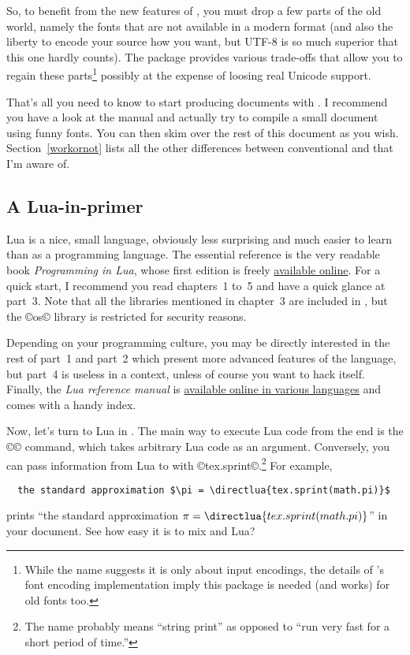 \documentclass{lltxdoc}
\begin{document}
So, to benefit from the new features of \luatex, you must drop a few parts of
the old world, namely the fonts that are not available in a modern format (and
also the liberty to encode your source how you want, but UTF-8 is so much
superior that this one hardly counts). The package  provides
various trade-offs that allow you to regain these parts\footnote{While the
  name suggests it is only about input encodings, the details of \latex's font
  encoding implementation imply this package is needed (and works) for old
  fonts too.} possibly at the expense of loosing real Unicode support.

That's all you need to know to start producing documents with \lualatex. I
recommend you have a look at the  manual and actually try to
compile a small document using funny fonts. You can then skim over the rest of
this document as you wish. Section~\ref{workornot} lists all the other
differences between conventional \latex and \lualatex that I'm aware of.

\subsection{A Lua-in-\tex primer}\label{luaintex}

Lua is a nice, small language, obviously less surprising and much easier to
learn than \tex as a programming language. The essential reference is the very
readable book \emph{Programming in Lua}, whose first edition is freely
\href{http://www.lua.org/pil/} {available online}. For a quick start, I
recommend you read chapters~1 to~5 and have a quick glance at part~3. Note
that all the libraries mentioned in chapter~3 are included in \luatex, but the
©os© library is restricted for security reasons.

Depending on your programming culture, you may be directly interested in the
rest of part~1 and part~2 which present more advanced features of the
language, but part~4 is useless in a \luatex context, unless of course you
want to hack \luatex itself. Finally, the \emph{Lua reference manual} is
\href{http://www.lua.org/manual/}{available online in various languages} and
comes with a handy index.

\medskip

Now, let's turn to Lua in \luatex. The main way to execute Lua code from the
\tex end is the ©\directlua© command, which takes arbitrary Lua code as an
argument. Conversely, you can pass information from Lua to \tex with
©tex.sprint©.\footnote{The name probably means ``string print'' as opposed to
  ``run very fast for a short period of time.''} For example,
\begin{Verbatim}
  the standard approximation $\pi = \directlua{tex.sprint(math.pi)}$
\end{Verbatim}
prints ``the standard  approximation $\pi = \directlua{tex.sprint(math.pi)}$''
in your document. See how easy it is to mix \tex and Lua?
\end{document}

